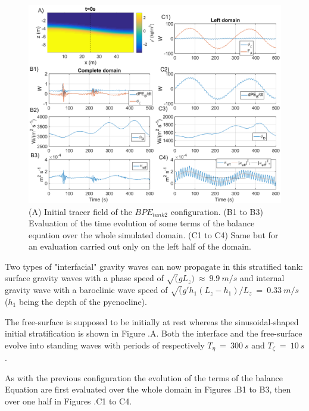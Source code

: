 \begin{figure}[h!]
\centering
\includegraphics[width=1\textwidth]{./CHAP_BPE/Fig_TANK_pyc.png}
\caption[Initial tracer field and evaluation of $\kappa_{eff}$ for configuration $BPE_{tank2}$]{(A) Initial tracer field of the $BPE_{tank2}$ configuration. (B1 to B3) Evaluation of the time evolution of some terms of the balance equation  over the whole simulated domain. (C1 to C4) Same but for an evaluation carried out only on the left half of the domain.}
\label{figCpsin}
\end{figure}
Two types of "interfacial" gravity waves can now propagate in this stratified tank: surface gravity waves with a phase speed of $\sqrt(g L_z) \ \approx \ 9.9\ m/s$ and internal gravity wave with a baroclinic wave speed of $\sqrt(g' h_1 (L_z-h_1)/L_z\ =\ 0.33\ m/s$ ($h_1$ being the depth of the pycnocline). %

The free-surface is supposed to be initially at rest whereas the sinusoidal-shaped initial stratification is shown in Figure .A. \color{red}Both the interface and the free-surface evolve into standing waves with periods of respectively $T_{\eta} \ = \ 300 \ s$ and $T_{\zeta} \ = \ 10 \ s$. \color{black}

As with the previous configuration the evolution of the terms of the balance Equation  are first evaluated over the whole domain in Figures .B1 to B3, then over one half in Figures .C1 to C4.

